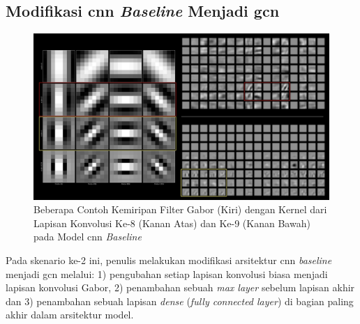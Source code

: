 \subsection{Modifikasi \acrshort{cnn} \textit{Baseline} Menjadi \acrshort{gcn}}
\begin{figure}[t]
    \centering
    \includegraphics[width=14cm]{gambar/visualisasi_kernel_lapisan8dan9.png}
    \caption{Beberapa Contoh Kemiripan Filter Gabor (Kiri) dengan Kernel dari Lapisan Konvolusi Ke-8 (Kanan Atas) dan Ke-9 (Kanan Bawah) pada Model \acrshort{cnn} \textit{Baseline}}
    \label{fig:visualisasikernel8dan9}
\end{figure}
Pada skenario ke-2 ini, penulis melakukan modifikasi arsitektur \acrshort{cnn} \textit{baseline} menjadi \acrshort{gcn} melalui: 1) pengubahan setiap lapisan konvolusi biasa menjadi lapisan konvolusi Gabor, 2) penambahan sebuah \textit{max layer} sebelum lapisan akhir dan 3) penambahan sebuah lapisan \textit{dense} (\textit{fully connected layer}) di bagian paling akhir dalam arsitektur model.

